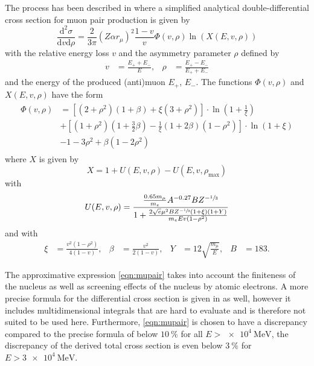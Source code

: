 The process has been described in \cite{Kelner2000} where a simplified analytical double-differential cross section for muon pair production is given by
\begin{equation}
    \label{eqn:mupair}
    \frac{\mathrm{d}^2\sigma}{\mathrm{d}v \mathrm{d}\rho} = \frac{2}{3\pi} (Z \alpha r_\mu)^2 \frac{1-v}{v} \Phi(v, \rho) \ln \left( X \left(E, v, \rho \right) \right)
\end{equation}
with the relative energy loss $v$ and the asymmetry parameter $\rho$ defined by
\begin{align}
    v &= \frac{E_+ + E_-}{E}, & \rho &= \frac{E_+ - E_-}{E_+ + E_-}
\end{align}
and the energy of the produced (anti)muon $E_+$, $E_-$.
The functions $\Phi(v, \rho)$ and $X(E, v, \rho)$ have the form
\begin{align}
    \begin{split}
    \Phi(v, \rho) &= \left[ (2 + \rho^2) (1 + \beta) + \xi (3 + \rho^2) \right] \cdot \ln{ \left( 1 + \frac{1}{\xi} \right) }\\ &+ \left[ (1 + \rho^2) \left( 1 + \frac{3}{2} \beta \right) - \frac{1}{\xi} (1 + 2 \beta) (1 - \rho^2) \right] \cdot \ln{ (1 + \xi) }\\ &- 1 - 3 \rho^2 + \beta (1 - 2 \rho^2)
    \end{split}
\end{align}
where $X$ is given by
\begin{equation}
    X = 1 + U(E, v, \rho) - U(E, v, \rho_\text{max})
\end{equation}
with 
\begin{equation}
    U(E, v, \rho) = \frac{\frac{0.65 m_{\mu}}{m_e} A^{-0.27} B Z^{-\sfrac{1}{3}}}{1 + \frac{2 \sqrt{e} \mu^2 B Z^{-\sfrac{1}{3}} (1 + \xi) (1 + Y) }{m_e E v (1 - \rho^2)} }
\end{equation}
and with 
\begin{align}
    \xi &= \frac{v^2 (1 - \rho^2)}{4 (1 - v)}, & \beta &= \frac{v^2}{2 (1 - v)}, & Y &= 12 \sqrt{\frac{m_{\mu}}{E}}, & B &= 183.
\end{align}

The approximative expression \eqref{eqn:mupair} takes into account the finiteness of the nucleus as well as screening effects of the nucleus by atomic electrons.
A more precise formula for the differential cross section is given in \cite{Kelner2000} as well, however it includes multidimensional integrals that are hard to evaluate and is therefore not suited to be used here.
Furthermore, \eqref{eqn:mupair} is chosen to have a discrepancy compared to the precise formula of below $\SI{10}{\percent}$ for all $E > \SI{e4}{\mega\electronvolt}$, the discrepancy of the derived total cross section is even below $\SI{3}{\percent}$ for $E > \SI{3e4}{\mega\electronvolt}$.

